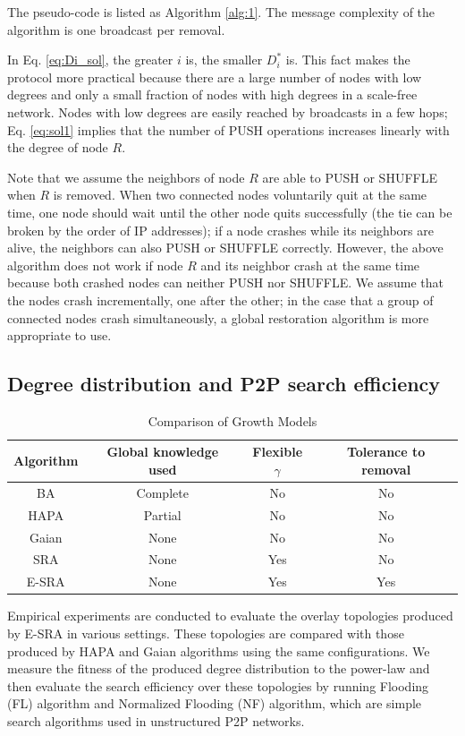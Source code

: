 The pseudo-code is listed as Algorithm \ref{alg:1}. The message complexity of the algorithm is one broadcast per removal.

In Eq. \ref{eq:Di_sol}, the greater $i$ is, the smaller $D_i^*$ is. This fact makes the protocol more practical because there are a large number of nodes with low degrees and only a small fraction of nodes with high degrees in a scale-free network. Nodes with low degrees are easily reached by broadcasts in a few hops; Eq. \ref{eq:sol1} implies that the number of PUSH operations increases linearly with the degree of node $R$.

Note that we assume the neighbors of node $R$ are able to PUSH or SHUFFLE when $R$ is removed. When two connected nodes voluntarily quit at the same time, one node should wait until the other node quits successfully (the tie can be broken by the order of IP addresses); if a node crashes while its neighbors are alive, the neighbors can also PUSH or SHUFFLE correctly. However, the above algorithm does not work if node $R$ and its neighbor crash at the same time because both crashed nodes can neither PUSH nor SHUFFLE. We assume that the nodes crash incrementally, one after the other; in the case that a group of connected nodes crash simultaneously, a global restoration algorithm is more appropriate to use.

\subsection{Degree distribution and P2P search efficiency}
\begin{table}[!t]
\caption{Comparison of Growth Models}
\label{table:compare}
\centering
\setlength\tabcolsep{2pt}
\begin{tabular}{|c|c|c|c|}
\hline
Algorithm&Global knowledge used&Flexible $\gamma$& Tolerance to removal\\
\hline
\hline
BA & Complete & No & No\\
\hline
HAPA & Partial & No & No\\
\hline
Gaian & None & No & No\\
\hline
SRA & None & Yes & No\\
\hline
E-SRA & None & Yes & Yes\\
\hline
\end{tabular}
\end{table}

Empirical experiments are conducted to evaluate the overlay topologies produced by E-SRA in various settings. These topologies are compared with those produced by HAPA and Gaian algorithms using the same configurations. We measure the fitness of the produced degree distribution to the power-law and then evaluate the search efficiency over these topologies by running Flooding (FL) algorithm and Normalized Flooding (NF) algorithm, which are simple search algorithms used in unstructured P2P networks\cite{adamic2001search}.

